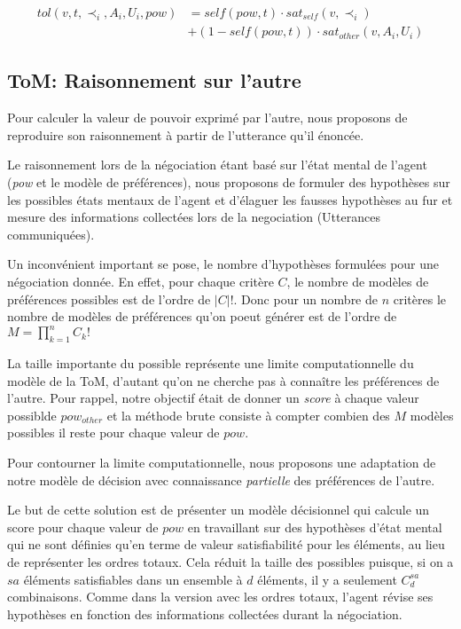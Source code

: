 \documentclass[runningheads,a4paper]{llncs}
\begin{document}
\begin{equation}
\begin{split}
tol(v, t, \prec_i, A_i, U_i, pow) & = self(pow, t)  \cdot sat_{self}(v, \prec_i) \\
& +  (1 - self(pow, t)) \cdot sat_{other}(v, A_i, U_i)
\end{split} 
\end{equation}


\subsection{ToM: Raisonnement sur l'autre}


Pour calculer la valeur de pouvoir exprimé par l'autre, nous proposons de reproduire son raisonnement à partir de l'utterance qu'il énoncée.

Le raisonnement lors de la négociation étant basé  sur l'état mental de l'agent (\textit{pow} et le modèle de préférences), nous proposons de formuler des hypothèses sur les possibles états mentaux de l'agent et d'élaguer les fausses hypothèses au fur et mesure des informations collectées lors de la negociation (Utterances communiquées).

Un inconvénient important se pose, le nombre d'hypothèses formulées pour une négociation donnée. En effet, pour chaque critère $C$, le nombre de modèles de préférences possibles est de l'ordre de $|C| !$. Donc pour un nombre de $n$ critères le nombre de modèles de préférences qu'on poeut générer est de l'ordre de $ M = \prod_{k=1}^n C_k!$

La taille importante du possible représente une limite computationnelle du modèle de la ToM, d'autant qu'on ne cherche pas à connaître les préférences de l'autre. Pour rappel, notre objectif était de donner un \emph{score} à chaque valeur possiblde $pow_{other}$ et la méthode brute consiste à compter combien des $M$ modèles possibles il reste pour chaque valeur de $pow$.

Pour contourner la limite computationnelle, nous proposons une adaptation de notre modèle de décision avec connaissance \emph{partielle} des préférences de l'autre. 

Le but de cette solution est de présenter un modèle décisionnel qui calcule un score pour chaque valeur de $pow$ en travaillant sur des hypothèses d'état mental qui ne sont définies qu'en terme de valeur satisfiabilité pour les éléments, au lieu de représenter les ordres totaux. Cela réduit la taille des possibles puisque, si on a $sa$ éléments satisfiables dans un ensemble à $d$ éléments, il y a seulement $C_d^{sa}$ combinaisons.
Comme dans la version avec les ordres totaux, l'agent révise ses hypothèses en fonction des informations collectées durant la négociation.
\end{document}
